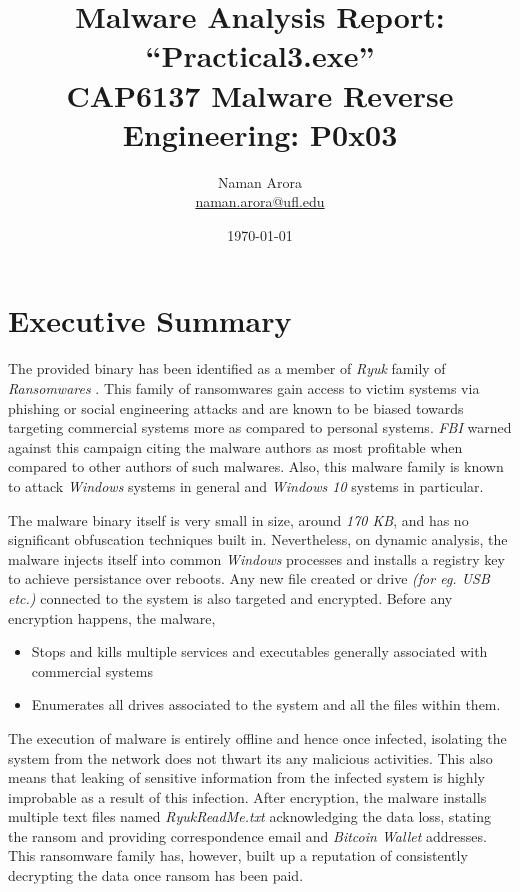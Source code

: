\documentclass[10pt,a4paper]{article}
\begin{document}

\title{Malware Analysis Report: ``Practical3.exe''\\ \vspace{-8pt} {\large CAP6137 Malware Reverse Engineering: P0x03}}
\author{{Naman Arora \\ \vspace{-10pt}\small \href{mailto:naman.arora@ufl.edu}{naman.arora@ufl.edu}}}
\date{\today}

\maketitle
\newpage
\tableofcontents
\newpage
\section{Executive Summary}
The provided binary has been identified as a member of \textit{Ryuk} family of \textit{Ransomwares} \cite{ransomware}.
This family of ransomwares gain access to victim systems via phishing \cite{phishing} or social engineering attacks \cite{socialEngg} and are known to be biased towards targeting commercial systems more as compared to personal systems.
\textit{FBI} warned against this campaign citing the malware authors as most profitable when compared to other authors of such malwares.
Also, this malware family is known to attack \textit{Windows} systems in general and \textit{Windows 10} systems in particular.

The malware binary itself is very small in size, around \textit{170 KB}, and has no significant obfuscation techniques built in.
Nevertheless, on dynamic analysis, the malware injects itself into common \textit{Windows} processes and installs a registry key to achieve persistance over reboots.
Any new file created or drive \textit{(for eg. USB etc.)} connected to the system is also targeted and encrypted.
Before any encryption happens, the malware,
\begin{itemize}
	\vspace{-1em}
	\item Stops and kills multiple services and executables generally associated with commercial systems
	\item Enumerates all drives associated to the system and all the files within them.
\end{itemize}

The execution of malware is entirely offline and hence once infected, isolating the system from the network does not thwart its any malicious activities.
This also means that leaking of sensitive information from the infected system is highly improbable as a result of this infection.
After encryption, the malware installs multiple text files named \textit{RyukReadMe.txt} acknowledging the data loss, stating the ransom and providing correspondence email and \textit{Bitcoin Wallet} addresses.
This ransomware family has, however, built up a reputation of consistently decrypting the data once ransom has been paid.
\end{document}
